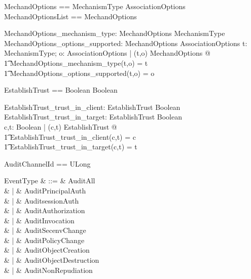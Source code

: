  
\begin{zed}
  MechandOptions == MechanismType \cross AssociationOptions \\
  MechandOptionsList == \seq MechandOptions
\end{zed}
\begin{axdef}
  MechandOptions\_mechanism\_type: MechandOptions \fun MechanismType\\
  MechandOptions\_options\_supported: MechandOptions \fun AssociationOptions
  \where
  \forall t: MechanismType; o: AssociationOptions | (t,o) \in MechandOptions @
  \\
  \t1 MechandOptions\_mechanism\_type(t,o) = t \\
  \t1 \land MechandOptions\_options\_supported(t,o) = o
\end{axdef}
\begin{zed}
  EstablishTrust == Boolean \cross Boolean
\end{zed}
\begin{axdef}
  EstablishTrust\_trust\_in\_client: EstablishTrust \fun Boolean \\
  EstablishTrust\_trust\_in\_target: EstablishTrust \fun Boolean \\
  \where
  \forall c,t: Boolean | (c,t) \in EstablishTrust @ \\
  \t1 EstablishTrust\_trust\_in\_client(c,t) = c \land \\
  \t1 EstablishTrust\_trust\_in\_target(c,t) = t  \\
\end{axdef}
\begin{zed}
   AuditChannelId == ULong
\end{zed}
\begin{syntax}
  EventType & ::= & AuditAll\\
  & | & AuditPrincipalAuth\\
  & | & AuditsessionAuth\\
  & | & AuditAuthorization\\
  & | & AuditInvocation\\
  & | & AuditSecenvChange\\
  & | & AuditPolicyChange\\
  & | & AuditObjectCreation\\
  & | & AuditObjectDestruction\\
  & | & AuditNonRepudiation
\end{syntax}
  
